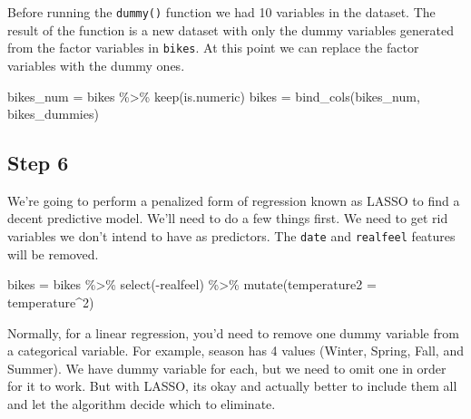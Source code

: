 \documentclass[
  letterpaper,
  DIV=11,
  numbers=noendperiod]{scrartcl}
\newenvironment{Shaded}{\begin{snugshade}}{\end{snugshade}}
\newcommand{\AttributeTok}[1]{\textcolor[rgb]{0.40,0.45,0.13}{#1}}
\newcommand{\CommentTok}[1]{\textcolor[rgb]{0.37,0.37,0.37}{#1}}
\newcommand{\DecValTok}[1]{\textcolor[rgb]{0.68,0.00,0.00}{#1}}
\newcommand{\FunctionTok}[1]{\textcolor[rgb]{0.28,0.35,0.67}{#1}}
\newcommand{\NormalTok}[1]{\textcolor[rgb]{0.00,0.23,0.31}{#1}}
\newcommand{\OtherTok}[1]{\textcolor[rgb]{0.00,0.23,0.31}{#1}}
\newcommand{\SpecialCharTok}[1]{\textcolor[rgb]{0.37,0.37,0.37}{#1}}
\begin{document}
Before running the \texttt{dummy()} function we had 10 variables in the
dataset. The result of the function is a new dataset with only the dummy
variables generated from the factor variables in \texttt{bikes}. At this
point we can replace the factor variables with the dummy ones.

\begin{Shaded}
\begin{Highlighting}[]
\NormalTok{bikes\_num }\OtherTok{=}\NormalTok{ bikes }\SpecialCharTok{\%\textgreater{}\%} \FunctionTok{keep}\NormalTok{(is.numeric)}
\NormalTok{bikes }\OtherTok{=} \FunctionTok{bind\_cols}\NormalTok{(bikes\_num, bikes\_dummies)}
\end{Highlighting}
\end{Shaded}

\hypertarget{step-6}{%
\subsection{Step 6}\label{step-6}}

We're going to perform a penalized form of regression known as LASSO to
find a decent predictive model. We'll need to do a few things first. We
need to get rid variables we don't intend to have as predictors. The
\texttt{date} and \texttt{realfeel} features will be removed.

\begin{Shaded}
\begin{Highlighting}[]
\NormalTok{bikes }\OtherTok{=}\NormalTok{ bikes }\SpecialCharTok{\%\textgreater{}\%}
  \FunctionTok{select}\NormalTok{(}\SpecialCharTok{{-}}\NormalTok{realfeel) }\SpecialCharTok{\%\textgreater{}\%}
  \FunctionTok{mutate}\NormalTok{(}\AttributeTok{temperature2 =}\NormalTok{ temperature}\SpecialCharTok{\^{}}\DecValTok{2}\NormalTok{)}
\end{Highlighting}
\end{Shaded}

Normally, for a linear regression, you'd need to remove one dummy
variable from a categorical variable. For example, season has 4 values
(Winter, Spring, Fall, and Summer). We have dummy variable for each, but
we need to omit one in order for it to work. But with LASSO, its okay
and actually better to include them all and let the algorithm decide
which to eliminate.

\begin{Shaded}
\end{Shaded}
\end{document}

